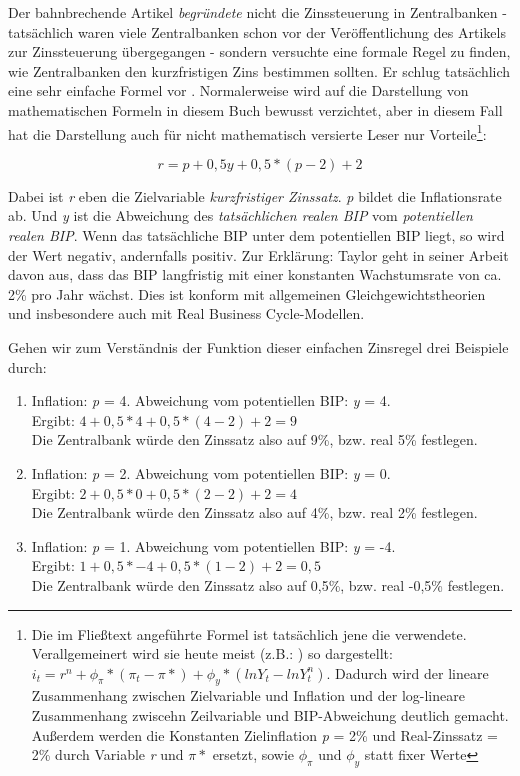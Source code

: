 Der bahnbrechende Artikel \textcite{Taylor1993} \textit{begründete} nicht die Zinssteuerung in Zentralbanken - tatsächlich waren viele Zentralbanken schon vor der Veröffentlichung des Artikels zur Zinssteuerung übergegangen - sondern versuchte eine formale Regel zu finden, wie Zentralbanken den kurzfristigen Zins bestimmen sollten. Er schlug tatsächlich eine sehr einfache Formel vor \parencite[S. 202]{Taylor1993}. Normalerweise wird auf die Darstellung von mathematischen Formeln in diesem Buch bewusst verzichtet, aber in diesem Fall hat die Darstellung auch für nicht mathematisch versierte Leser nur Vorteile\footnote{Die im Fließtext angeführte Formel ist tatsächlich jene die \textcite{Taylor1993} verwendete. Verallgemeinert wird sie heute meist (z.B.: \textcite[S. 609]{Romer2019}) so dargestellt: $i_t = r^n + \phi_{\pi}*(\pi_{t} - \pi*) + \phi_y * (ln Y_t - lnY^{n}_{t})$. Dadurch wird der lineare Zusammenhang zwischen Zielvariable und Inflation und der log-lineare Zusammenhang zwiscehn Zeilvariable und BIP-Abweichung deutlich gemacht. Außerdem werden die Konstanten Zielinflation \textit{p} = 2\% und Real-Zinssatz = 2\% durch Variable \textit{r} und $\pi*$ ersetzt, sowie  $\phi_{\pi}$ und $\phi_y$ statt fixer Werte}:

$$ r = p + 0,5y + 0,5 *(p-2) + 2 $$

Dabei ist \textit{r} eben die Zielvariable \textit{kurzfristiger Zinssatz}. \textit{p} bildet die Inflationsrate ab. Und \textit{y} ist die Abweichung des \textit{tatsächlichen realen BIP} vom \textit{potentiellen realen BIP}. Wenn das tatsächliche BIP unter dem potentiellen BIP liegt, so wird der Wert negativ, andernfalls positiv. Zur Erklärung: Taylor geht in seiner Arbeit davon aus, dass das BIP langfristig mit einer konstanten Wachstumsrate von ca. 2\% pro Jahr wächst. Dies ist konform mit allgemeinen Gleichgewichtstheorien und insbesondere auch mit Real Business Cycle-Modellen.


 Gehen wir zum Verständnis der Funktion dieser einfachen Zinsregel drei Beispiele durch:
\begin{enumerate}
	\item Inflation: \textit{p} = 4. Abweichung vom potentiellen BIP: \textit{y} = 4. \\
	Ergibt:	$ 4 + 0,5*4 + 0,5 *(4-2) + 2 = 9$ \\
	Die Zentralbank würde den Zinssatz also auf 9\%, bzw. real 5\% festlegen.
	\item Inflation: \textit{p} = 2. Abweichung vom potentiellen BIP: \textit{y} = 0. \\
	Ergibt:	$ 2 + 0,5*0 + 0,5 *(2-2) + 2 = 4$ \\
	Die Zentralbank würde den Zinssatz also auf 4\%, bzw. real 2\% festlegen.
	\item Inflation: \textit{p} = 1. Abweichung vom potentiellen BIP: \textit{y} = -4. \\
	Ergibt:	$ 1 + 0,5*-4 + 0,5 *(1-2) + 2 = 0,5$ \\
	Die Zentralbank würde den Zinssatz also auf 0,5\%, bzw. real -0,5\% festlegen.
	
\end{enumerate}

